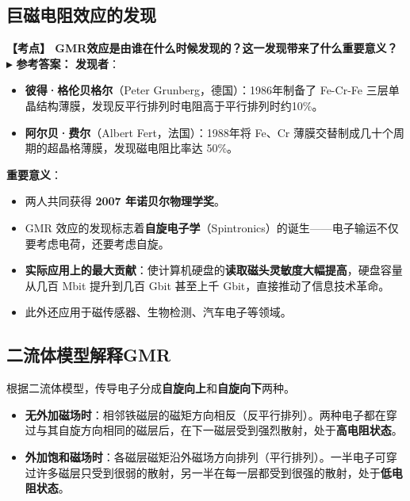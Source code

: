 \documentclass[12pt,a4paper]{article}
\newcommand{\hl}[1]{\textbf{\color{red}#1}}
\newcommand{\exam}[1]{\textbf{\color{blue!70!black}【考点】#1}}
\newcommand{\answer}[1]{\vspace{2pt}\noindent\textbf{\color{teal!80!black}▸ 参考答案：}#1\vspace{4pt}}
\newcommand{\qa}[2]{\exam{#1}\answer{#2}}
\begin{document}
\subsection{巨磁电阻效应的发现}
\qa{
    GMR效应是由谁在什么时候发现的？这一发现带来了什么重要意义？
}{
    \textbf{发现者}：
    \begin{itemize}
        \item \textbf{彼得·格伦贝格尔}（Peter Grunberg，德国）：1986年制备了 Fe-Cr-Fe 三层单晶结构薄膜，发现反平行排列时电阻高于平行排列时约10\%。
        \item \textbf{阿尔贝·费尔}（Albert Fert，法国）：1988年将 Fe、Cr 薄膜交替制成几十个周期的超晶格薄膜，发现磁电阻比率达 50\%。
    \end{itemize}

    \textbf{重要意义}：
    \begin{itemize}
        \item 两人共同获得 \textbf{2007 年诺贝尔物理学奖}。
        \item GMR 效应的发现标志着\textbf{自旋电子学}（Spintronics）的诞生——电子输运不仅要考虑电荷，还要考虑自旋。
        \item \hl{实际应用上的最大贡献}：使计算机硬盘的\textbf{读取磁头灵敏度大幅提高}，硬盘容量从几百 Mbit 提升到几百 Gbit 甚至上千 Gbit，直接推动了信息技术革命。
        \item 此外还应用于磁传感器、生物检测、汽车电子等领域。
    \end{itemize}
}

\subsection{二流体模型解释GMR}
根据二流体模型，传导电子分成\textbf{自旋向上}和\textbf{自旋向下}两种。

\begin{itemize}
    \item \hl{无外加磁场时}：相邻铁磁层的磁矩方向相反（反平行排列）。两种电子都在穿过与其自旋方向相同的磁层后，在下一磁层受到强烈散射，处于\textbf{高电阻状态}。
    \item \hl{外加饱和磁场时}：各磁层磁矩沿外磁场方向排列（平行排列）。一半电子可穿过许多磁层只受到很弱的散射，另一半在每一层都受到很强的散射，处于\textbf{低电阻状态}。
\end{itemize}
\end{document}
